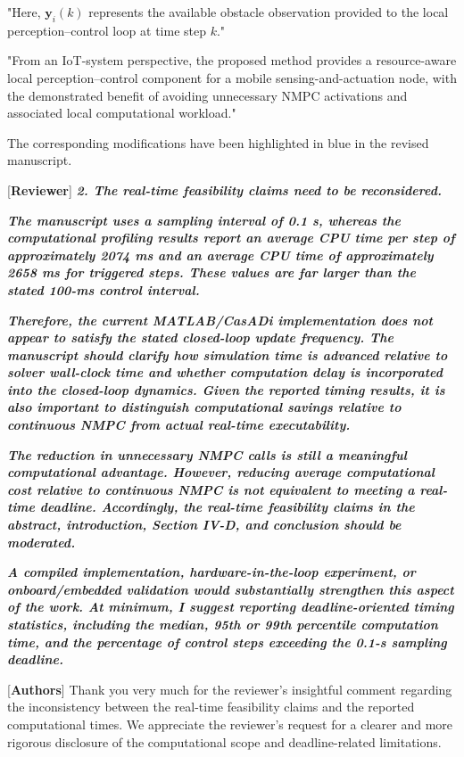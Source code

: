 \documentclass[12pt, twosides]{article}
\newcommand{\vect}[1]{\mathbf{#1}}
\theoremstyle{definition}
\begin{document}
"Here, $\vect{y}_i(k)$ represents the available obstacle observation provided to the local perception--control loop at time step $k$."

"From an IoT-system perspective, the proposed method provides a resource-aware local perception--control component for a mobile sensing-and-actuation node, with the demonstrated benefit of avoiding unnecessary NMPC activations and associated local computational workload."

The corresponding modifications have been highlighted in blue in the revised manuscript.

\medskip

\textcolor[rgb]{0.00,0.00,1.00}{[\textbf {Reviewer}]} \textit{\textbf{2. The real-time feasibility claims need to be reconsidered.}}

\textit{\textbf{The manuscript uses a sampling interval of 0.1 s, whereas the computational profiling results report an average CPU time per step of approximately 2074 ms and an average CPU time of approximately 2658 ms for triggered steps. These values are far larger than the stated 100-ms control interval.}}

\textit{\textbf{Therefore, the current MATLAB/CasADi implementation does not appear to satisfy the stated closed-loop update frequency. The manuscript should clarify how simulation time is advanced relative to solver wall-clock time and whether computation delay is incorporated into the closed-loop dynamics. Given the reported timing results, it is also important to distinguish computational savings relative to continuous NMPC from actual real-time executability.}}

\textit{\textbf{The reduction in unnecessary NMPC calls is still a meaningful computational advantage. However, reducing average computational cost relative to continuous NMPC is not equivalent to meeting a real-time deadline. Accordingly, the real-time feasibility claims in the abstract, introduction, Section IV-D, and conclusion should be moderated.}}

\textit{\textbf{A compiled implementation, hardware-in-the-loop experiment, or onboard/embedded validation would substantially strengthen this aspect of the work. At minimum, I suggest reporting deadline-oriented timing statistics, including the median, 95th or 99th percentile computation time, and the percentage of control steps exceeding the 0.1-s sampling deadline.}}

\textcolor[rgb]{0.00,0.00,1.00}{[\textbf{Authors}]} Thank you very much for the reviewer's insightful comment regarding the inconsistency between the real-time feasibility claims and the reported computational times. We appreciate the reviewer's request for a clearer and more rigorous disclosure of the computational scope and deadline-related limitations.
\end{document}
